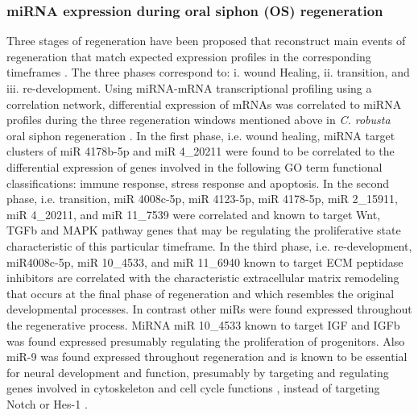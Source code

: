\documentclass[graybox]{svmult}
\begin{document}
\subsubsection{miRNA expression during oral siphon (OS) regeneration}
Three stages of regeneration have been proposed that reconstruct main events of 
regeneration that match expected expression profiles in the corresponding 
timeframes \cite{Knapp:2013}. The three phases correspond to: i. wound Healing, 
ii. transition, and iii. re-development. Using miRNA-mRNA transcriptional 
profiling using a correlation network, differential expression of mRNAs was 
correlated to miRNA profiles during the three regeneration windows mentioned 
above in \textit{C. robusta} oral siphon regeneration \cite{Spina:2017}. In 
the first phase, i.e. wound healing, miRNA target clusters of miR 4178b-5p and 
miR 4\_20211 were found to be correlated to the differential expression of genes 
involved in the following GO term functional classifications: immune response, 
stress response and apoptosis. In the second phase, i.e. transition, miR 
4008c-5p, miR 4123-5p, miR 4178-5p, miR 2\_15911, miR 4\_20211, and miR 11\_7539 
were correlated and known to target Wnt, TGFb and MAPK pathway genes that may be 
regulating the proliferative state characteristic of this particular timeframe. 
In the third phase, i.e. re-development, miR4008c-5p, miR 10\_4533, and miR 
11\_6940 known to target ECM peptidase inhibitors are correlated with the 
characteristic extracellular matrix remodeling that occurs at the final phase of 
regeneration and which resembles the original developmental processes. In 
contrast other miRs were found expressed throughout the regenerative process. 
MiRNA miR 10\_4533 known to target IGF and IGFb was found expressed presumably 
regulating the proliferation of progenitors. Also miR-9 was found expressed 
throughout regeneration and is known to be essential for neural development and 
function, presumably by targeting and regulating genes involved in cytoskeleton 
and cell cycle functions \cite{Galderisi:2003rt, MCBEATH2004483}, instead of 
targeting Notch or Hes-1 \cite{Spina:2017}.
\end{document}
